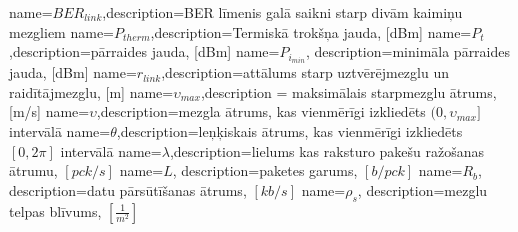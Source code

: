 
 {name=$BER_{link}$,description={BER līmenis galā saikni starp divām kaimiņu mezgliem}}
  {name=$P_{therm}$,description={Termiskā trokšņa jauda, [dBm]}}
      {name=$P_{t}$,description={pārraides jauda, [dBm]}}
   {name=$P_{i_{min}}$, description={minimāla pārraides jauda, [dBm]}}
   {name=$r_{link}$,description={attālums starp uztvērējmezglu un raidītājmezglu, [m]}}
    {name=$\upsilon_{max}$,description = {maksimālais starpmezglu ātrums, [m/s]}}
        {name=$\upsilon$,description={mezgla ātrums, kas vienmērīgi izkliedēts $(0, \upsilon_{max}]$ intervālā}}
    {name=$\theta$,description={leņķiskais ātrums, kas vienmērīgi izkliedēts $[0, 2\pi]$ intervālā}}
   {name=$\lambda$,description={lielums kas raksturo pakešu ražošanas ātrumu, $[pck/s]$}}
        {name=$L$, description={paketes garums, $[b/pck]$}}
      {name=$R_{b}$, description={datu pārsūtīšanas ātrums, $[kb/s]$}}
      {name=$\rho_{s}$, description={mezglu telpas blīvums, $[\frac{1}{m^2}]$}}


